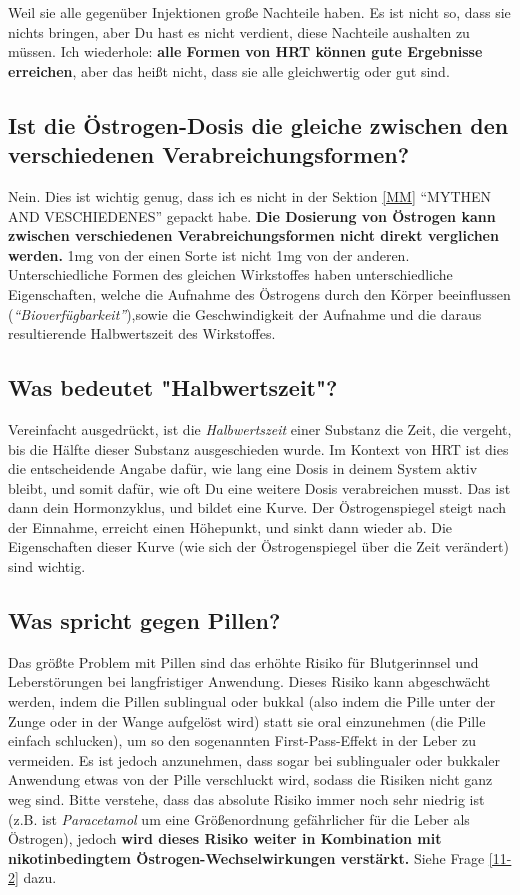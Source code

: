 \documentclass{article}
\begin{document}
Weil sie alle gegenüber Injektionen große Nachteile haben. Es ist nicht so, dass sie nichts bringen, aber Du hast es nicht verdient, diese Nachteile aushalten zu müssen. Ich wiederhole: \textbf{alle Formen von HRT können gute Ergebnisse erreichen}, aber das heißt nicht, dass sie alle gleichwertig oder gut sind.

\subsection{Ist die Östrogen-Dosis die gleiche zwischen den verschiedenen Verabreichungsformen?}

Nein. Dies ist wichtig genug, dass ich es nicht in der Sektion \ref{MM} “MYTHEN AND VESCHIEDENES” gepackt habe. \textbf{Die Dosierung von Östrogen kann zwischen verschiedenen Verabreichungsformen nicht direkt verglichen werden.} 1mg von der einen Sorte ist nicht 1mg von der anderen. Unterschiedliche Formen des gleichen Wirkstoffes haben unterschiedliche Eigenschaften, welche die Aufnahme des Östrogens durch den Körper beeinflussen (\textit{“Bioverfügbarkeit”}),sowie die Geschwindigkeit der Aufnahme und die daraus resultierende Halbwertszeit des Wirkstoffes.

\subsection{Was bedeutet "Halbwertszeit"?}

Vereinfacht ausgedrückt, ist die \textit{Halbwertszeit} einer Substanz die Zeit, die vergeht, bis die Hälfte dieser Substanz ausgeschieden wurde. Im Kontext von HRT ist dies die entscheidende Angabe dafür, wie lang eine Dosis in deinem System aktiv bleibt, und somit dafür, wie oft Du eine weitere Dosis verabreichen musst. Das ist dann dein Hormonzyklus, und bildet eine Kurve. Der Östrogenspiegel steigt nach der Einnahme, erreicht einen Höhepunkt, und sinkt dann wieder ab. Die Eigenschaften dieser Kurve (wie sich der Östrogenspiegel über die Zeit verändert) sind wichtig.

\subsection{Was spricht gegen Pillen?}

Das größte Problem mit Pillen sind das erhöhte Risiko für Blutgerinnsel und Leberstörungen bei langfristiger Anwendung. Dieses Risiko kann abgeschwächt werden, indem die Pillen sublingual oder bukkal (also indem die Pille unter der Zunge oder in der Wange aufgelöst wird) statt sie oral einzunehmen (die Pille einfach schlucken), um so den sogenannten First-Pass-Effekt in der Leber zu vermeiden. Es ist jedoch anzunehmen, dass sogar bei sublingualer oder bukkaler Anwendung etwas von der Pille verschluckt wird, sodass die Risiken nicht ganz weg sind. Bitte verstehe, dass das absolute Risiko immer noch sehr niedrig ist (z.B. ist \textit{Paracetamol} um eine Größenordnung gefährlicher für die Leber als Östrogen), jedoch \textbf{wird dieses Risiko weiter in Kombination mit nikotinbedingtem Östrogen-Wechselwirkungen verstärkt.} Siehe Frage \ref{11-2} dazu.
\end{document}
